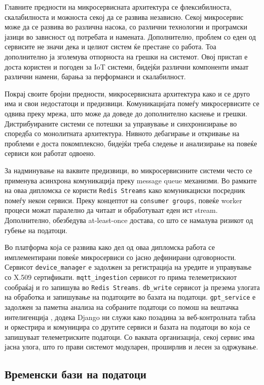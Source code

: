 Главните предности на микросервисната архитектура се флексибилноста,
скалабилноста и можноста секој да се развива независно. Секој
микросервис може да се развива во различна насока, со различни
технологии и програмски јазици во зависност од потребата и намената.
Дополнително, проблем со еден од сервисите не значи дека и целиот систем
ќе престане со работа. Тоа дополнително ја зголемува отпорноста на
грешки на системот. Овој пристап е доста користен и погоден за IoT
системи, бидејќи различни компоненти имаат различни намени, барања за
перформанси и скалабилност.

Покрај своите бројни предности, микросервисната архитектура како и се
друго има и свои недостатоци и предизвици. Комуникацијата помеѓу
микросервисите се одвива преку мрежа, што може да доведе до дополнително
каснење и грешки. Дистрибуираните системи се потешки за управување и
синхронизирање во споредба со монолитната архитектура. Нивното
дебагирање и откривање на проблеми е доста покомплексно, бидејќи треба
следење и анализирање на повеќе сервиси кои работат одвоено.

За надминување на ваквите предизвици, во микросервисините системи често
се применува асинхрона комуникација преку message queue механизми. Во
рамките на оваа дипломска се користи \texttt{Redis Streams} како комуникациски
посредник помеѓу некои сервиси. Преку концептот на \texttt{consumer groups},
повеќе worker процеси можат паралелно да читаат и обработуваат еден ист
stream. Дополнително, обезбедува at-least-once достава, со што се
намалува ризикот од губење на податоци.

Во платформа која се развива како дел од оваа дипломска работа се
имплементирани повеќе микросервиси со јасно дефинирани одговорности.
Сервисот \texttt{device\_manager} е задолжен за регистрација на уредите и
управување со X.509 сертификати. \texttt{mqtt\_ingestion} сервисот го прима
телеметрискиот сообраќај и го запишува во \texttt{Redis Streams}. \texttt{db\_write}
сервисот ја презема улогата на обработка и запишување на податоците во
базата на податоци. \texttt{gpt\_service} е задолжен за паметна анализа на
собраните податоци со помош на вештачка интелигенција , додека Django ни
служи како позадина за веб-контролната табла и оркестрира и комуницира
со другите сервиси и базата на податоци во која се запишуваат
телеметриските податоци. Со ваквата организација, секој сервис има јасна
улога, што го прави системот модуларен, проширлив и лесен за одржување.

\subsection{Временски бази на податоци}

